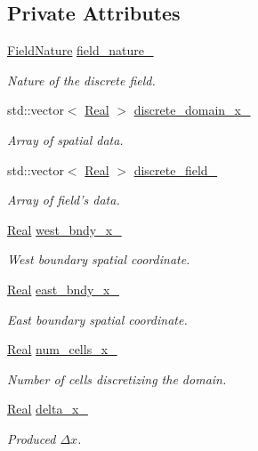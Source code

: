 \subsection*{Private Attributes}
\begin{DoxyCompactItemize}
\item 
\hyperlink{group__c02-enums_ga4c54f2a329cfb4e56213b02a259d19e2}{Field\+Nature} \hyperlink{classmtk_1_1UniStgGrid1D_a5eb70ff8b7dfa204f7f1338ad689e802}{field\+\_\+nature\+\_\+}
\begin{DoxyCompactList}\small\item\em Nature of the discrete field. \end{DoxyCompactList}\item 
std\+::vector$<$ \hyperlink{group__c01-roots_gac080bbbf5cbb5502c9f00405f894857d}{Real} $>$ \hyperlink{classmtk_1_1UniStgGrid1D_a0a1f9c00e21659e05f414dd97e2a52e3}{discrete\+\_\+domain\+\_\+x\+\_\+}
\begin{DoxyCompactList}\small\item\em Array of spatial data. \end{DoxyCompactList}\item 
std\+::vector$<$ \hyperlink{group__c01-roots_gac080bbbf5cbb5502c9f00405f894857d}{Real} $>$ \hyperlink{classmtk_1_1UniStgGrid1D_a7379a5c6d16210cdd61ffa731bc47edc}{discrete\+\_\+field\+\_\+}
\begin{DoxyCompactList}\small\item\em Array of field's data. \end{DoxyCompactList}\item 
\hyperlink{group__c01-roots_gac080bbbf5cbb5502c9f00405f894857d}{Real} \hyperlink{classmtk_1_1UniStgGrid1D_a6910438d3396d0b9a130d11d16979c46}{west\+\_\+bndy\+\_\+x\+\_\+}
\begin{DoxyCompactList}\small\item\em West boundary spatial coordinate. \end{DoxyCompactList}\item 
\hyperlink{group__c01-roots_gac080bbbf5cbb5502c9f00405f894857d}{Real} \hyperlink{classmtk_1_1UniStgGrid1D_a69a7d6be3171e53177e476348d04f4ae}{east\+\_\+bndy\+\_\+x\+\_\+}
\begin{DoxyCompactList}\small\item\em East boundary spatial coordinate. \end{DoxyCompactList}\item 
\hyperlink{group__c01-roots_gac080bbbf5cbb5502c9f00405f894857d}{Real} \hyperlink{classmtk_1_1UniStgGrid1D_afa43750db0029b7454aef343759e7097}{num\+\_\+cells\+\_\+x\+\_\+}
\begin{DoxyCompactList}\small\item\em Number of cells discretizing the domain. \end{DoxyCompactList}\item 
\hyperlink{group__c01-roots_gac080bbbf5cbb5502c9f00405f894857d}{Real} \hyperlink{classmtk_1_1UniStgGrid1D_a12577bbe0b88e9a0ac9b2267f2fcc48c}{delta\+\_\+x\+\_\+}
\begin{DoxyCompactList}\small\item\em Produced $ \Delta x $. \end{DoxyCompactList}\end{DoxyCompactItemize}
